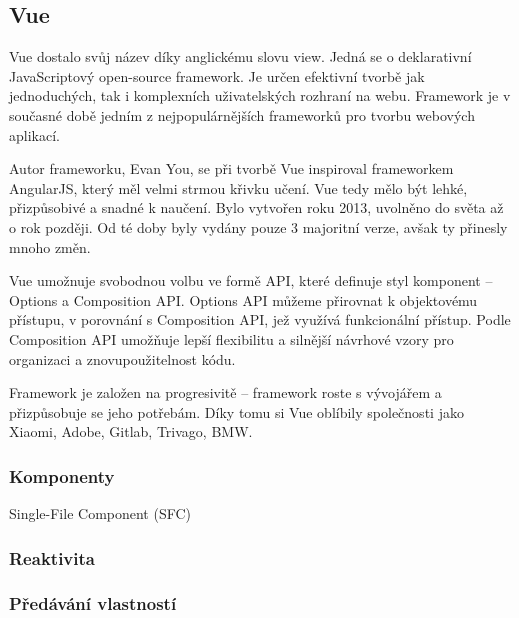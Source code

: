 \subsection{Vue}


Vue dostalo svůj název díky anglickému slovu view. Jedná se o deklarativní JavaScriptový open-source framework. 
Je určen efektivní tvorbě jak jednoduchých, tak i komplexních uživatelských rozhraní na webu. 
Framework je v současné době jedním z nejpopulárnějších frameworků pro tvorbu webových aplikací.\cite{vuemacrae,vue}

Autor frameworku, Evan You, se při tvorbě Vue inspiroval frameworkem AngularJS, který měl velmi strmou křivku učení. Vue tedy mělo být lehké, přizpůsobivé a snadné k naučení.
Bylo vytvořen roku 2013, uvolněno do světa až o rok později. Od té doby byly vydány pouze 3 majoritní verze, avšak ty přinesly mnoho změn.\cite{vueflexiple,vuemedium}

Vue umožnuje svobodnou volbu ve formě API, které definuje styl komponent -- Options a Composition API. 
Options API můžeme přirovnat k objektovému přístupu, v porovnání s Composition API, jež využívá funkcionální přístup. 
Podle \cite{vue} Composition API umožňuje lepší flexibilitu a silnější návrhové vzory pro organizaci a znovupoužitelnost kódu.

Framework je založen na progresivitě -- framework roste s vývojářem a přizpůsobuje se jeho potřebám. 
Díky tomu si Vue oblíbily společnosti jako Xiaomi, Adobe, Gitlab, Trivago, BMW.\cite{vuetriodev,vue}

\subsubsection{Komponenty}

Single-File Component (SFC)

\subsubsection{Reaktivita}
\subsubsection{Předávání vlastností}
